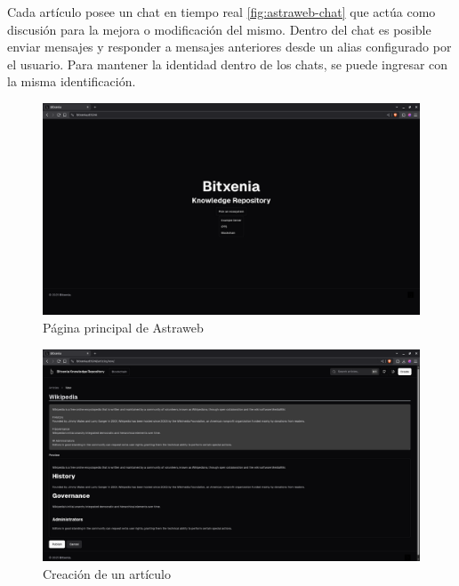 Cada artículo posee un chat en tiempo real \ref{fig:astraweb-chat} que actúa como discusión para la mejora o modificación del mismo. Dentro del chat es posible enviar mensajes y responder a mensajes anteriores desde un alias configurado por el usuario. Para mantener la identidad dentro de los chats, se puede ingresar con la misma identificación.

\begin{figure}[H]
    \centering
    \includegraphics[width=1\linewidth]{img/frontends/astraweb-main-page.png}
    \caption{Página principal de Astraweb}
    \label{fig:astraweb-main-page}
\end{figure}

\begin{figure}[H]
    \centering
    \includegraphics[width=1\linewidth]{img/frontends/create-article.png}
    \caption{Creación de un artículo}
    \label{fig:astraweb-create-article}
\end{figure}


